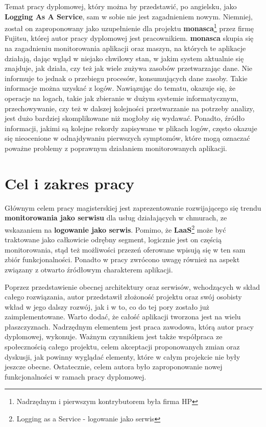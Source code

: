 Temat pracy dyplomowej, który można by przedstawić, po angielsku, jako \textbf{Logging As A Service}, sam w sobie nie jest zagadnieniem
nowym. Niemniej, został on zaproponowany jako uzupełnienie dla projektu \textbf{monasca}\footnote{Nadrzędnym i pierwszym kontrybutorem była firma HP} przez
firmę Fujitsu, której autor pracy dyplomowej jest pracownikiem. 
\textbf{monasca} skupia się na zagadnieniu monitorowania aplikacji oraz maszyn, na których te aplikacje działają, dając wgląd w niejako
chwilowy stan, w jakim system aktualnie się znajduje, jak działa, czy też jak wiele zużywa zasobów przetwarzając dane. Nie informuje to jednak o 
przebiegu procesów, konsumujących dane zasoby. Takie informacje można uzyskać z logów. Nawiązując do tematu, okazuje się, że operacje na logach, takie jak 
zbieranie w dużym systemie informatycznym, przechowywanie, czy też w dalszej kolejności przetwarzanie na potrzeby analizy, jest dużo bardziej 
skomplikowane niż mogłoby się wydawać. Ponadto, źródło informacji, jakimi są kolejne rekordy zapisywane w plikach logów, często okazuje się nieocenione w 
odnajdywaniu pierwszych symptomów, które mogą oznaczać poważne problemy z poprawnym działaniem monitorowanych aplikacji.

\section{Cel i zakres pracy}

Głównym celem pracy magisterskiej jest zaprezentowanie rozwijającego się trendu \textbf{monitorowania jako serwisu} dla usług działających w chmurach,
ze wskazaniem na \textbf{logowanie jako serwis}. Pomimo, że \textbf{LaaS}\footnote{Logging as a Service - logowanie jako serwis} 
może być traktowane jako całkowicie odrębny segment, logicznie jest on częścią monitorowania, stąd też możliwości przezeń oferowane wpisują się w ten sam
zbiór funkcjonalności. Ponadto w pracy zwrócono uwagę również na aspekt związany z otwarto źródłowym charakterem aplikacji.

Poprzez przedstawienie obecnej architektury oraz serwisów, wchodzących w skład całego rozwiązania, autor przedstawił złożoność projektu
oraz swój osobisty wkład w jego dalszy rozwój, jak i w to, co do tej pory zostało już zaimplementowane. Warto dodać, że całość
aplikacji tworzona jest na wielu płaszczyznach. Nadrzędnym elementem jest praca zawodowa, którą autor pracy dyplomowej, wykonuje.
Ważnym czynnikiem jest także współpraca ze społecznością całego projektu, celem akceptacji proponowanych zmian
oraz dyskusji, jak powinny wyglądać elementy, które w całym projekcie nie były jeszcze obecne. Ostatecznie, celem autora 
było zaproponowanie nowej funkcjonalności w ramach pracy dyplomowej.

